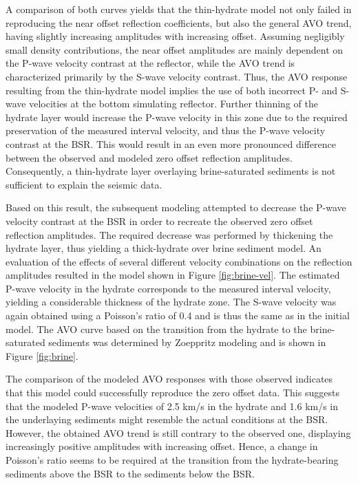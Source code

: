 A comparison of both curves yields that the thin-hydrate model not only failed
in reproducing the near offset reflection coefficients, but also the general 
AVO trend, having slightly increasing amplitudes with increasing offset.
Assuming negligibly small density contributions, the near offset amplitudes
are mainly dependent on the P-wave velocity contrast at the reflector, 
while the AVO trend is 
characterized primarily by the S-wave velocity contrast.
Thus, the AVO response resulting from the thin-hydrate model implies the use
of both incorrect P- and S-wave velocities at the bottom simulating reflector.
Further thinning of the hydrate layer would increase the P-wave
velocity in this zone due to the required preservation of the measured 
interval velocity, and thus the P-wave velocity contrast at the BSR.
This would result in an even more pronounced difference between the observed 
and modeled zero offset reflection amplitudes. Consequently, a thin-hydrate
layer overlaying brine-saturated sediments is not sufficient to explain
the seismic data.
\par
Based on this result, the subsequent modeling attempted to decrease the 
P-wave velocity contrast at the BSR in order to recreate the observed zero 
offset reflection amplitudes. The required decrease was performed by thickening
the hydrate layer, thus yielding a thick-hydrate over brine sediment model. 
An evaluation of the effects of several different velocity combinations on
the reflection amplitudes resulted in the model shown in Figure \ref{fig:brine-vel}.
The estimated P-wave velocity in the hydrate 
corresponds to the measured interval velocity,
yielding a considerable thickness of the hydrate zone. The S-wave velocity was
again obtained using a Poisson's ratio of 0.4 and is thus the same as in the 
initial model.
The AVO curve based on the transition from the hydrate to the brine-saturated
sediments was determined by Zoeppritz modeling and is shown in
Figure \ref{fig:brine}.
\par
The comparison of the modeled AVO responses with those observed 
indicates that this
model could successfully reproduce the zero offset data. This suggests that the
modeled P-wave velocities of 2.5 km/s in the hydrate and 1.6 km/s in
the underlaying sediments might resemble the actual conditions at the BSR.
However, the obtained AVO trend is still contrary to the observed one,
displaying increasingly positive amplitudes with increasing offset. Hence,
a change in Poisson's ratio seems to be required at the transition from the
hydrate-bearing sediments above the BSR to the sediments below the BSR.
